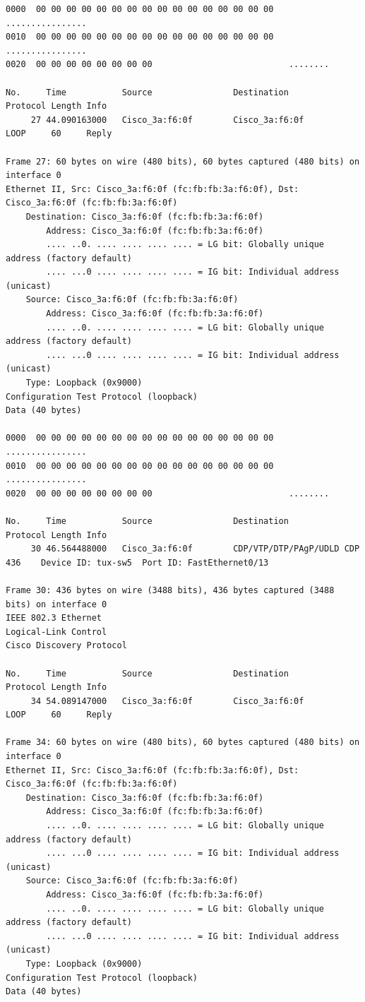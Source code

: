 \documentclass[a4paper,11pt]{article}
\begin{document}
\begin{lstlisting}
0000  00 00 00 00 00 00 00 00 00 00 00 00 00 00 00 00   ................
0010  00 00 00 00 00 00 00 00 00 00 00 00 00 00 00 00   ................
0020  00 00 00 00 00 00 00 00                           ........

No.     Time           Source                Destination           Protocol Length Info
     27 44.090163000   Cisco_3a:f6:0f        Cisco_3a:f6:0f        LOOP     60     Reply

Frame 27: 60 bytes on wire (480 bits), 60 bytes captured (480 bits) on interface 0
Ethernet II, Src: Cisco_3a:f6:0f (fc:fb:fb:3a:f6:0f), Dst: Cisco_3a:f6:0f (fc:fb:fb:3a:f6:0f)
    Destination: Cisco_3a:f6:0f (fc:fb:fb:3a:f6:0f)
        Address: Cisco_3a:f6:0f (fc:fb:fb:3a:f6:0f)
        .... ..0. .... .... .... .... = LG bit: Globally unique address (factory default)
        .... ...0 .... .... .... .... = IG bit: Individual address (unicast)
    Source: Cisco_3a:f6:0f (fc:fb:fb:3a:f6:0f)
        Address: Cisco_3a:f6:0f (fc:fb:fb:3a:f6:0f)
        .... ..0. .... .... .... .... = LG bit: Globally unique address (factory default)
        .... ...0 .... .... .... .... = IG bit: Individual address (unicast)
    Type: Loopback (0x9000)
Configuration Test Protocol (loopback)
Data (40 bytes)

0000  00 00 00 00 00 00 00 00 00 00 00 00 00 00 00 00   ................
0010  00 00 00 00 00 00 00 00 00 00 00 00 00 00 00 00   ................
0020  00 00 00 00 00 00 00 00                           ........

No.     Time           Source                Destination           Protocol Length Info
     30 46.564488000   Cisco_3a:f6:0f        CDP/VTP/DTP/PAgP/UDLD CDP      436    Device ID: tux-sw5  Port ID: FastEthernet0/13  

Frame 30: 436 bytes on wire (3488 bits), 436 bytes captured (3488 bits) on interface 0
IEEE 802.3 Ethernet 
Logical-Link Control
Cisco Discovery Protocol

No.     Time           Source                Destination           Protocol Length Info
     34 54.089147000   Cisco_3a:f6:0f        Cisco_3a:f6:0f        LOOP     60     Reply

Frame 34: 60 bytes on wire (480 bits), 60 bytes captured (480 bits) on interface 0
Ethernet II, Src: Cisco_3a:f6:0f (fc:fb:fb:3a:f6:0f), Dst: Cisco_3a:f6:0f (fc:fb:fb:3a:f6:0f)
    Destination: Cisco_3a:f6:0f (fc:fb:fb:3a:f6:0f)
        Address: Cisco_3a:f6:0f (fc:fb:fb:3a:f6:0f)
        .... ..0. .... .... .... .... = LG bit: Globally unique address (factory default)
        .... ...0 .... .... .... .... = IG bit: Individual address (unicast)
    Source: Cisco_3a:f6:0f (fc:fb:fb:3a:f6:0f)
        Address: Cisco_3a:f6:0f (fc:fb:fb:3a:f6:0f)
        .... ..0. .... .... .... .... = LG bit: Globally unique address (factory default)
        .... ...0 .... .... .... .... = IG bit: Individual address (unicast)
    Type: Loopback (0x9000)
Configuration Test Protocol (loopback)
Data (40 bytes)


\end{lstlisting}
\end{document}
